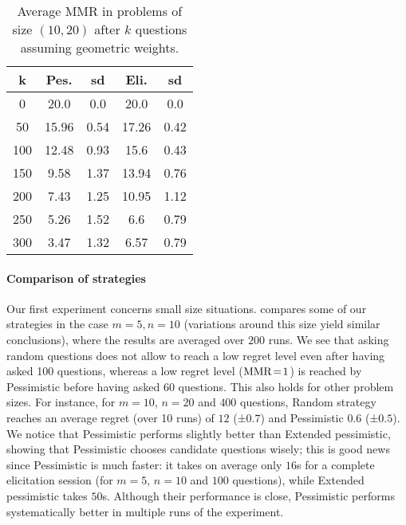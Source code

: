 \documentclass{article}
\begin{document}
\begin{table}
	\caption{Average MMR in problems of size $(10, 20)$ after $k$ questions assuming geometric weights.}
	\label{tab:geometricWeights}
	\begin{tabular}{S[table-figures-integer=3, table-figures-decimal=0]S[table-number-alignment = right]@{ ± }S[table-number-alignment = left, table-figures-integer=1]S[table-number-alignment = right]@{ ± }S[table-number-alignment = left, table-figures-integer=1]}
		\toprule
		{k} & {Pes.} & {sd} & {Eli.} & {sd} \\
			&20.0	&0.0	&20.0	&0.0\\
		50	&15.96	&0.54	&17.26	&0.42\\
		100	&12.48	&0.93	&15.6	&0.43\\
		150	&9.58	&1.37	&13.94	&0.76\\
		200	&7.43	&1.25	&10.95	&1.12\\
		250	&5.26	&1.52	&6.6	&0.79\\
		300	&3.47	&1.32	&6.57	&0.79\\
		\bottomrule
	\end{tabular}
\end{table}
\paragraph{Comparison of strategies}
Our first experiment concerns small size situations.
 compares some of our strategies in the case $m = 5, n = 10$ (variations around this size yield similar conclusions), where the results are averaged over $200$ runs.
We see that asking random questions does not allow to reach a low regret level even after having asked 100 questions, whereas a low regret level ($\operatorname{MMR} \!=\! 1$) is reached by Pessimistic before having asked 60 questions. This also holds for other problem sizes. For instance, for $m =10$, $n = 20$ and $400$ questions, Random strategy reaches an average regret (over 10 runs) of $12$ (±$ 0.7$) and Pessimistic $0.6$ (±$ 0.5$).
We notice that Pessimistic performs slightly better than Extended pessimistic, showing that Pessimistic chooses candidate questions wisely; this is good news since Pessimistic is much faster: it takes on average only $16$s for a complete elicitation session (for $m = 5$, $n = 10$ and $100$ questions), while Extended pessimistic takes $50$s. Although their performance is close, Pessimistic performs systematically better in multiple runs of the experiment.
\end{document}
